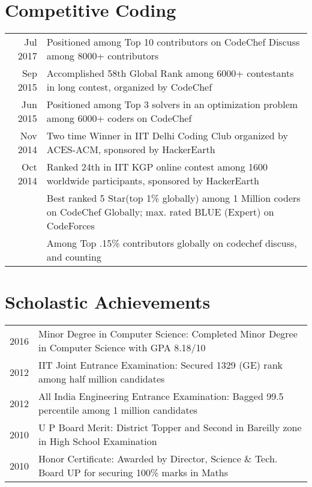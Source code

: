 \documentclass[a4paper,10pt]{article}
\begin{document}
\section{Competitive Coding}
\begin{tabular}{r|p{16cm}}	

Jul 2017 & Positioned among Top 10 contributors on CodeChef Discuss among 8000+ contributors\\
Sep 2015 & Accomplished 58th Global Rank among 6000+ contestants in long contest, organized by CodeChef\\
Jun 2015 & Positioned among Top 3 solvers in an optimization problem among 6000+ coders on CodeChef\\
Nov 2014 & Two time Winner in IIT Delhi Coding Club organized by ACES-ACM, sponsored by HackerEarth\\
Oct 2014 & Ranked 24th in IIT KGP online contest among 1600 worldwide participants, sponsored by HackerEarth\\
& Best ranked 5 Star(top 1\% globally) among 1 Million coders on CodeChef Globally; max. rated BLUE (Expert) on CodeForces\\
& Among Top .15\% contributors globally on codechef discuss, and counting\\

\end{tabular}

\section{Scholastic Achievements}
\begin{tabular}{r|p{16cm}}	

2016 & Minor Degree in Computer Science: Completed Minor Degree in Computer Science with GPA 8.18/10\\
2012 & IIT Joint Entrance Examination: Secured 1329 (GE) rank among half million candidates\\
2012 & All India Engineering Entrance Examination: Bagged 99.5 percentile among 1 million candidates\\
2010 & U P Board Merit: District Topper and Second in Bareilly zone in High School Examination\\
2010 & Honor Certificate: Awarded by Director, Science \& Tech. Board UP for securing 100\% marks in Maths\\

\end{tabular}
\end{document}
